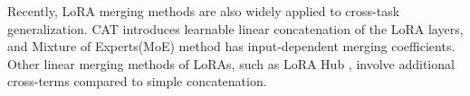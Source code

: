Recently, LoRA merging methods are also widely applied to cross-task generalization. CAT \cite{prabhakar2024lora} introduces learnable linear concatenation of the LoRA layers, and Mixture of Experts(MoE) \cite{buehler2024x, feng2024mixture} method has input-dependent merging coefficients. Other linear merging methods of LoRAs, such as LoRA Hub \cite{huang2023lorahub}, involve additional cross-terms compared to simple concatenation. %